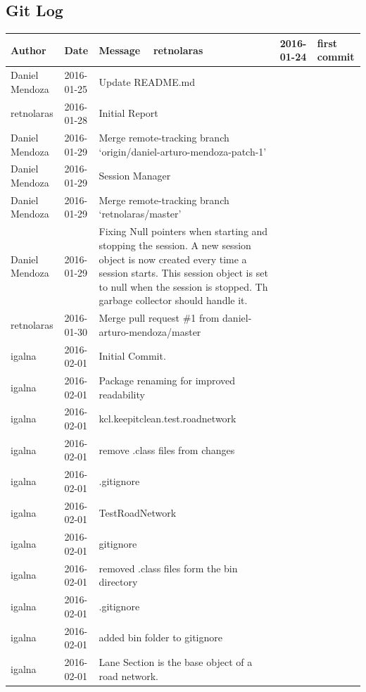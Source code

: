 \documentclass[11pt]{article}
\begin{document}
\begin{enumerate}
\subsection{Git Log}
\begin{center}
\begin{longtabu}to \textwidth {|
     X[4,l]|
     X[3,c]|
     X[8,l]|}
    \hline
    \textbf{Author} & \textbf{Date} & \textbf{Message} \ \hline
retnolaras & 2016-01-24 & first commit \\ \hline
Daniel Mendoza & 2016-01-25 & Update README.md \\ \hline
retnolaras & 2016-01-28 & Initial Report \\ \hline
Daniel Mendoza & 2016-01-29 & Merge remote-tracking branch `origin/daniel-arturo-mendoza-patch-1' \\ \hline
Daniel Mendoza & 2016-01-29 & Session Manager \\ \hline
Daniel Mendoza & 2016-01-29 & Merge remote-tracking branch `retnolaras/master' \\ \hline
Daniel Mendoza & 2016-01-29 & Fixing Null pointers when starting and stopping the session. A new session object is now created every time a session starts. This session object is set to null when the session is stopped. Th garbage collector should handle it. \\ \hline
retnolaras & 2016-01-30 & Merge pull request \#1 from daniel-arturo-mendoza/master \\ \hline
igalna & 2016-02-01 & Initial Commit. \\ \hline
igalna & 2016-02-01 & Package renaming for improved readability \\ \hline
igalna & 2016-02-01 & kcl.keepitclean.test.roadnetwork \\ \hline
igalna & 2016-02-01 & remove .class files from changes \\ \hline
igalna & 2016-02-01 & .gitignore \\ \hline
igalna & 2016-02-01 & TestRoadNetwork \\ \hline
igalna & 2016-02-01 & gitignore \\ \hline
igalna & 2016-02-01 & removed .class files form the bin directory \\ \hline
igalna & 2016-02-01 & .gitignore \\ \hline
igalna & 2016-02-01 & added bin folder to gitignore \\ \hline
igalna & 2016-02-01 & Lane Section is the base object of a road network. \\ \hline

\end{longtabu}
\end{center}
\end{enumerate}
\end{document}
